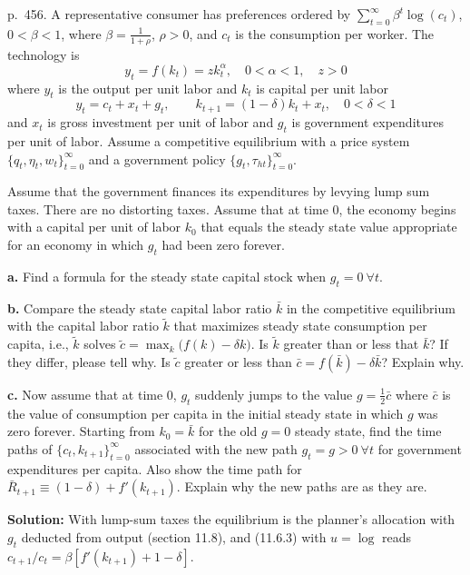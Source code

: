 \documentclass[12pt, letterpaper]{article}
\begin{document}
\begin{tcolorbox}[oddbox,title={Exercise 11.5 \quad Log utility, the golden rule and a jump in $g$}]
\begin{tcolorbox}[questionbox]
p.~456. A representative consumer has preferences ordered by $\sum_{t=0}^\infty\beta^t\log(c_t)$, $0<\beta<1$, where
$\beta=\frac1{1+\rho}$, $\rho>0$, and $c_t$ is the consumption per worker. The technology is
\[
y_t=f(k_t)=zk_t^\alpha,\quad0<\alpha<1,\quad z>0
\]
where $y_t$ is the output per unit labor and $k_t$ is capital per unit labor
\[
y_t=c_t+x_t+g_t,\qquad k_{t+1}=(1-\delta)k_t+x_t,\quad0<\delta<1
\]
and $x_t$ is gross investment per unit of labor and $g_t$ is government expenditures per unit of labor. Assume a
competitive equilibrium with a price system $\{q_t,\eta_t,w_t\}_{t=0}^\infty$ and a government policy
$\{g_t,\tau_{ht}\}_{t=0}^\infty$.

Assume that the government finances its expenditures by levying lump sum taxes. There are no distorting taxes. Assume
that at time 0, the economy begins with a capital per unit of labor $k_0$ that equals the steady state value appropriate
for an economy in which $g_t$ had been zero forever.

\textbf{a.} Find a formula for the steady state capital stock when $g_t=0\ \forall t$.

\textbf{b.} Compare the steady state capital labor ratio $\bar k$ in the competitive equilibrium with the capital labor
ratio $\tilde k$ that maximizes steady state consumption per capita, i.e., $\tilde k$ solves
$\tilde c=\max_k\big(f(k)-\delta k\big)$. Is $\tilde k$ greater than or less that $\bar k$? If they differ, please tell
why. Is $\tilde c$ greater or less than $\bar c=f(\bar k)-\delta\bar k$? Explain why.

\textbf{c.} Now assume that at time 0, $g_t$ suddenly jumps to the value $g=\frac12\bar c$ where $\bar c$ is the value of
consumption per capita in the initial steady state in which $g$ was zero forever. Starting from $k_0=\bar k$ for the old
$g=0$ steady state, find the time paths of $\{c_t,k_{t+1}\}_{t=0}^\infty$ associated with the new path $g_t=g>0\ \forall t$
for government expenditures per capita. Also show the time path for $\bar R_{t+1}\equiv(1-\delta)+f'(k_{t+1})$. Explain
why the new paths are as they are.
\end{tcolorbox}

\textbf{Solution:} With lump-sum taxes the equilibrium is the planner's allocation with $g_t$ deducted from output
(section 11.8), and (11.6.3) with $u=\log$ reads $c_{t+1}/c_t=\beta[f'(k_{t+1})+1-\delta]$.


\end{tcolorbox}
\end{document}
